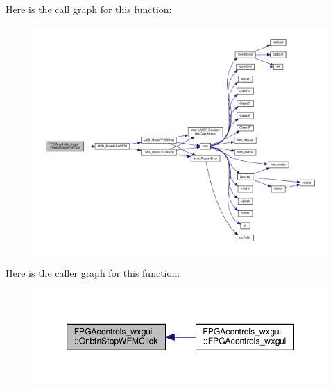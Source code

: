 Here is the call graph for this function\+:
\nopagebreak
\begin{figure}[H]
\begin{center}
\leavevmode
\includegraphics[width=350pt]{d7/db5/classFPGAcontrols__wxgui_a0fa030c03abad5ce458e7284fc3e8a5e_cgraph}
\end{center}
\end{figure}




Here is the caller graph for this function\+:
\nopagebreak
\begin{figure}[H]
\begin{center}
\leavevmode
\includegraphics[width=347pt]{d7/db5/classFPGAcontrols__wxgui_a0fa030c03abad5ce458e7284fc3e8a5e_icgraph}
\end{center}
\end{figure}


